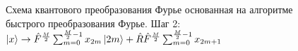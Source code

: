 \begin{figure}
\centering



\caption{Схема квантового преобразования Фурье основанная на алгоритме
быстрого преобразования Фурье. Шаг 2: 
$\ket{x} \rightarrow
\hat{F}^{\frac{M}{2}} \sum_{m = 0}^{\frac{M}{2} - 1}x_{2m} \ket{2m} +
\hat{R}\hat{F}^{\frac{M}{2}} \sum_{m = 0}^{\frac{M}{2} - 1} x_{2m + 1}$}
\label{figQuantCompQuantFourier2}
\end{figure}
